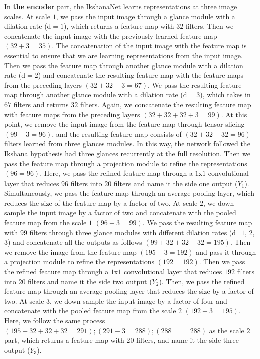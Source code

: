 \documentclass{article}
\begin{document}
In \textbf{the encoder} part, the IkshanaNet learns representations at three image scales. At scale $1$, we pass the input image through a glance module with a dilation rate (d$=1$), which returns a feature map with $32$ filters. Then we concatenate the input image with the previously learned feature map $(32+3=35)$. The concatenation of the input image with the feature map is essential to ensure that we are learning representations from the input image. Then we pass the feature map through another glance module with a dilation rate (d$=2$) and concatenate the resulting feature map with the feature maps from the preceding layers $(32+32+3=67)$. We pass the resulting feature map through another glance module with a dilation rate (d$=3$), which takes in $67$ filters and returns $32$ filters. Again, we concatenate the resulting feature map with feature maps from the preceding layers $(32+32+32+3=99)$. At this point, we remove the input image from the feature map through tensor slicing $(99-3=96)$, and the resulting feature map consists of $(32+32+32=96)$ filters learned from three glances modules. In this way, the network followed the Ikshana hypothesis had three glances recurrently at the full resolution. Then we pass the feature map through a projection module to refine the representations $(96=96)$. Here, we pass the refined feature map through a $1$x$1$ convolutional layer that reduces $96$ filters into $20$ filters and name it the side one output ($Y_{1}$). Simultaneously, we pass the feature map through an average pooling layer, which reduces the size of the feature map by a factor of two.\newline
At scale $2$, we down-sample the input image by a factor of two and concatenate with the pooled feature map from the scale $1$ $(96+3=99)$. We pass the resulting feature map with $99$ filters through three glance modules with different dilation rates (d=$1$, $2$, $3$) and concatenate all the outputs as follows $(99+32+32+32=195)$. Then we remove the image from the feature map $(195-3=192)$ and pass it through a  projection module to refine the representations $(192=192)$. Then we pass the refined feature map through a $1$x$1$ convolutional layer that reduces $192$ filters into $20$ filters and name it the side two output ($Y_{2}$). Then, we pass the refined feature map through an average pooling layer that reduces the size by a factor of two.\newline
At scale $3$, we down-sample the input image by a factor of four and concatenate with the pooled feature map from the scale $2$ $(192+3=195)$. Here, we follow the same process $(195+32+32+32=291);(291-3=288);(288==288)$ as the scale $2$ part, which returns a feature map with $20$ filters, and name it the side three output ($Y_{3}$). \newline
\end{document}
